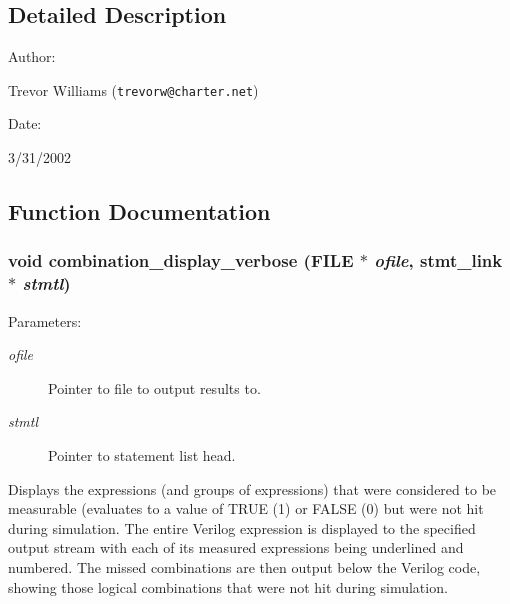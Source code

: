 \subsection{Detailed Description}


\begin{Desc}
\item[Author: ]\par
Trevor Williams ({\tt trevorw@charter.net}) \end{Desc}
\begin{Desc}
\item[Date: ]\par
3/31/2002\end{Desc}


\subsection{Function Documentation}
\subsubsection{\setlength{\rightskip}{0pt plus 5cm}void combination\_\-display\_\-verbose (FILE $\ast$ {\em ofile}, {\bf stmt\_\-link} $\ast$ {\em stmtl})}\label{comb_8c_a12}


\begin{Desc}
\item[Parameters: ]\par
\begin{description}
\item[{\em 
ofile}]Pointer to file to output results to. \item[{\em 
stmtl}]Pointer to statement list head.\end{description}
\end{Desc}
Displays the expressions (and groups of expressions) that were considered  to be measurable (evaluates to a value of TRUE (1) or FALSE (0) but were  not hit during simulation. The entire Verilog expression is displayed to the specified output stream with each of its measured expressions being underlined and numbered. The missed combinations are then output below the Verilog code, showing those logical combinations that were not hit during simulation. 
